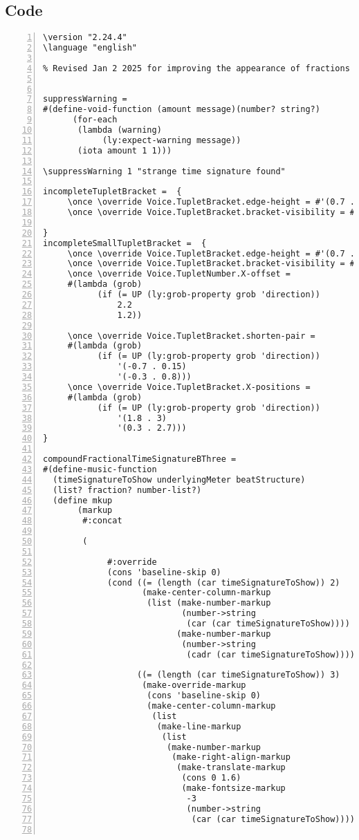 \subsection{Code}
\begin{Verbatim}[numbers=left,xleftmargin=5mm]
\version "2.24.4"
\language "english"

% Revised Jan 2 2025 for improving the appearance of fractions


suppressWarning =
#(define-void-function (amount message)(number? string?)
      (for-each
       (lambda (warning)
            (ly:expect-warning message))
       (iota amount 1 1)))

\suppressWarning 1 "strange time signature found"

incompleteTupletBracket =  {
     \once \override Voice.TupletBracket.edge-height = #'(0.7 . 0)
     \once \override Voice.TupletBracket.bracket-visibility = ##t

}
incompleteSmallTupletBracket =  {
     \once \override Voice.TupletBracket.edge-height = #'(0.7 . 0)
     \once \override Voice.TupletBracket.bracket-visibility = ##t
     \once \override Voice.TupletNumber.X-offset =
     #(lambda (grob)
           (if (= UP (ly:grob-property grob 'direction))
               2.2
               1.2))

     \once \override Voice.TupletBracket.shorten-pair =
     #(lambda (grob)
           (if (= UP (ly:grob-property grob 'direction))
               '(-0.7 . 0.15)
               '(-0.3 . 0.8)))
     \once \override Voice.TupletBracket.X-positions =
     #(lambda (grob)
           (if (= UP (ly:grob-property grob 'direction))
               '(1.8 . 3)
               '(0.3 . 2.7)))
}

compoundFractionalTimeSignatureBThree =
#(define-music-function
  (timeSignatureToShow underlyingMeter beatStructure)
  (list? fraction? number-list?)
  (define mkup
       (markup
        #:concat

        (

             #:override
             (cons 'baseline-skip 0)
             (cond ((= (length (car timeSignatureToShow)) 2)
                    (make-center-column-markup
                     (list (make-number-markup
                            (number->string
                             (car (car timeSignatureToShow))))
                           (make-number-markup
                            (number->string
                             (cadr (car timeSignatureToShow)))))))

                   ((= (length (car timeSignatureToShow)) 3)
                    (make-override-markup
                     (cons 'baseline-skip 0)
                     (make-center-column-markup
                      (list
                       (make-line-markup
                        (list
                         (make-number-markup
                          (make-right-align-markup
                           (make-translate-markup
                            (cons 0 1.6)
                            (make-fontsize-markup
                             -3
                             (number->string
                              (car (car timeSignatureToShow)))))))


\end{Verbatim}
